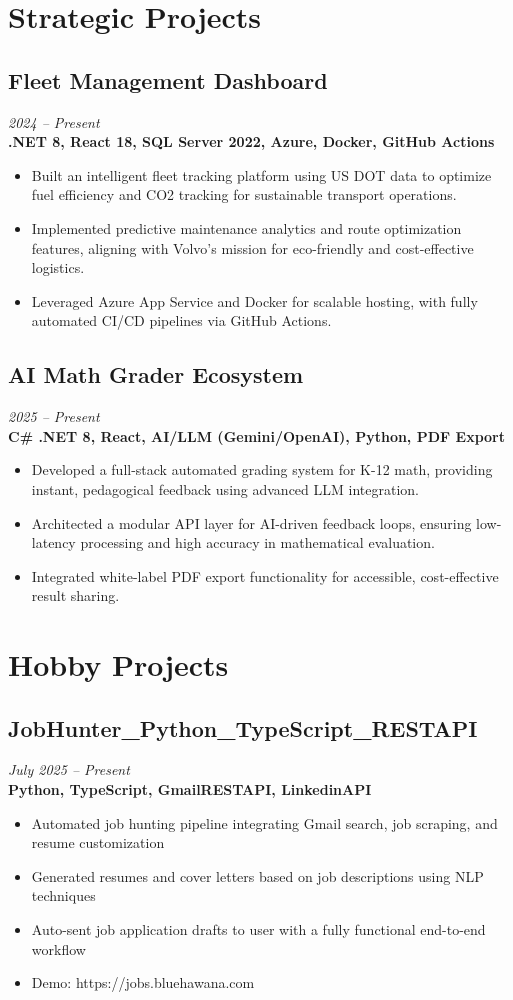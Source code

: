 \documentclass[11pt,a4paper]{article}
\begin{document}
\section*{Strategic Projects}
\subsection{Fleet Management Dashboard}
\textit{2024 -- Present} \\
\textbf{.NET 8, React 18, SQL Server 2022, Azure, Docker, GitHub Actions}
\begin{itemize}
\item Built an intelligent fleet tracking platform using US DOT data to optimize fuel efficiency and CO2 tracking for sustainable transport operations.
\item Implemented predictive maintenance analytics and route optimization features, aligning with Volvo's mission for eco-friendly and cost-effective logistics.
\item Leveraged Azure App Service and Docker for scalable hosting, with fully automated CI/CD pipelines via GitHub Actions.
\end{itemize}

\subsection{AI Math Grader Ecosystem}
\textit{2025 -- Present} \\
\textbf{C\# .NET 8, React, AI/LLM (Gemini/OpenAI), Python, PDF Export}
\begin{itemize}
\item Developed a full-stack automated grading system for K-12 math, providing instant, pedagogical feedback using advanced LLM integration.
\item Architected a modular API layer for AI-driven feedback loops, ensuring low-latency processing and high accuracy in mathematical evaluation.
\item Integrated white-label PDF export functionality for accessible, cost-effective result sharing.
\end{itemize}

\section*{Hobby Projects}
\subsection{JobHunter\_Python\_TypeScript\_RESTAPI}
\textit{July 2025 -- Present} \\
\textbf{Python, TypeScript, GmailRESTAPI, LinkedinAPI}
\begin{itemize}
\item Automated job hunting pipeline integrating Gmail search, job scraping, and resume customization
\item Generated resumes and cover letters based on job descriptions using NLP techniques
\item Auto-sent job application drafts to user with a fully functional end-to-end workflow
\item Demo: https://jobs.bluehawana.com
\end{itemize}
\end{document}
